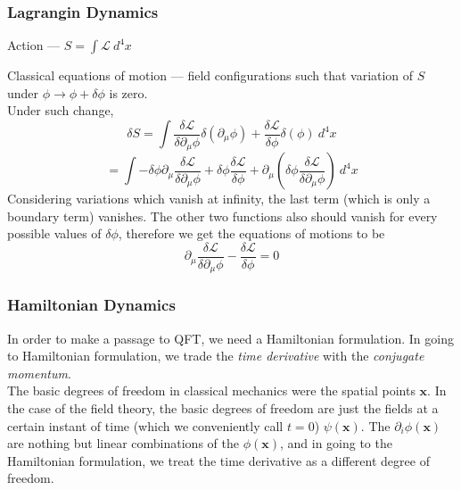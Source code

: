 \documentclass[11pt, notitlepage]{report}
\newcommand{\del}{\partial}
\newcommand{\ld}{\mathcal{L}}
\numberwithin{equation}{section}
\begin{document}
    \subsubsection{Lagrangin Dynamics}
    Action — \(S = \int \ld~d^4x\)
    \begin{center}
    \end{center}
    Classical equations of motion — field configurations such that variation of \(S\) under \(\phi \to \phi + \delta\phi\) is zero. \\
    Under such change, 
    \begin{equation*}
        \delta S = \int \frac{\delta \ld}{\delta \del_\mu \phi}\delta(\del_\mu \phi) + \frac{\delta \ld}{\delta \phi}\delta(\phi) ~d^4x
    \end{equation*}
    \begin{equation}
        = \int -\delta\phi \del_\mu\frac{\delta \ld}{\delta \del_\mu \phi} + \delta\phi\frac{\delta \ld}{\delta \phi} + \del_\mu \left( \delta\phi \frac{\delta \ld}{\delta \del_\mu \phi} \right)~d^4x  
    \end{equation}
    Considering variations which vanish at infinity, the last term (which is only a boundary term) vanishes. The other two functions also should vanish for every possible values of \(\delta \phi\), therefore we get the equations of motions to be 
    \begin{equation}
        \del_\mu\frac{\delta \ld}{\delta \del_\mu \phi} - \frac{\delta \ld}{\delta \phi} = 0
    \end{equation}

    \subsubsection{Hamiltonian Dynamics}
    In order to make a passage to QFT, we need a Hamiltonian formulation. In going to Hamiltonian formulation, we trade the \textit{time derivative} with the \textit{conjugate momentum}.\\

    The basic degrees of freedom in classical mechanics were the spatial points \(\textbf{x}\). In the case of the field theory, the basic degrees of freedom are just the fields at a certain instant of time (which we conveniently call \(t=0\)) \(\psi(\textbf{x})\). The \(\del_i \phi(\textbf{x})\) are nothing but linear combinations of the \(\phi(\textbf{x})\), and in going to the Hamiltonian formulation, we treat the time derivative as a different degree of freedom.
\end{document}
